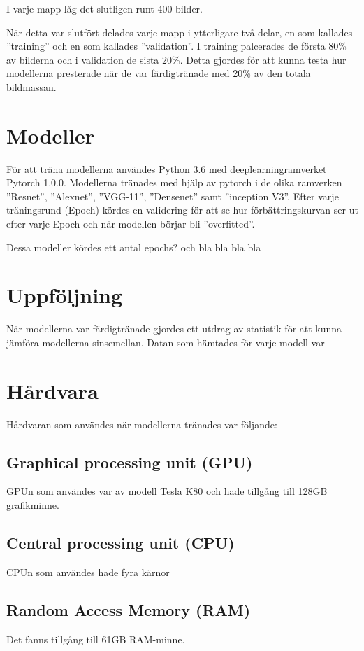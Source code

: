 \documentclass{kththesis}
\begin{document}
I varje mapp låg det slutligen runt 400 bilder. 

När detta var slutfört delades varje mapp i ytterligare två delar, en som kallades ”training” och en som kallades ”validation”.
I training palcerades de första 80\% av bilderna och i validation de sista 20\%.
Detta gjordes för att kunna testa hur modellerna presterade när de var färdigtränade med 20\% av den totala bildmassan.


\section{Modeller}
För att träna modellerna användes Python 3.6 med deeplearningramverket Pytorch 1.0.0. 
Modellerna tränades med  hjälp av pytorch i de olika ramverken ”Resnet”, ”Alexnet”, ”VGG-11”, ”Densenet” samt ”inception V3”.
Efter varje träningsrund (Epoch) kördes en validering för att se hur förbättringskurvan ser ut efter varje Epoch och när modellen börjar bli ”overfitted”.

Dessa modeller kördes ett antal epochs? och bla bla bla bla

\section{Uppföljning}
När modellerna var färdigtränade gjordes ett utdrag av statistik för att kunna jämföra modellerna sinsemellan.
Datan som hämtades för varje modell var


\section{Hårdvara}
Hårdvaran som användes när modellerna tränades var följande:

\subsection{Graphical processing unit (GPU)}
GPUn som användes var av modell Tesla K80 och hade tillgång till 128GB grafikminne.

\subsection{Central processing unit (CPU)}
CPUn som användes hade fyra kärnor 

\subsection{Random Access Memory (RAM)}
Det fanns tillgång till 61GB RAM-minne.
\end{document}
